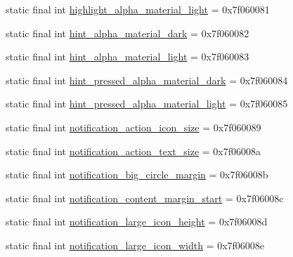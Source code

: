\begin{DoxyCompactItemize}
\item 
static final int \mbox{\hyperlink{classandroid_1_1support_1_1v7_1_1appcompat_1_1_r_1_1dimen_a86a754bbbd93cc196da3b0b984a92c32}{highlight\+\_\+alpha\+\_\+material\+\_\+light}} = 0x7f060081
\item 
static final int \mbox{\hyperlink{classandroid_1_1support_1_1v7_1_1appcompat_1_1_r_1_1dimen_a5efc01f623b7f9ebe49eb5d465af1fea}{hint\+\_\+alpha\+\_\+material\+\_\+dark}} = 0x7f060082
\item 
static final int \mbox{\hyperlink{classandroid_1_1support_1_1v7_1_1appcompat_1_1_r_1_1dimen_acb5326fcfa564801a635a71e58879dce}{hint\+\_\+alpha\+\_\+material\+\_\+light}} = 0x7f060083
\item 
static final int \mbox{\hyperlink{classandroid_1_1support_1_1v7_1_1appcompat_1_1_r_1_1dimen_aebb62a73f9575168ba99a010d1013dfb}{hint\+\_\+pressed\+\_\+alpha\+\_\+material\+\_\+dark}} = 0x7f060084
\item 
static final int \mbox{\hyperlink{classandroid_1_1support_1_1v7_1_1appcompat_1_1_r_1_1dimen_a9ff0848bc63374bd8e7268ceb5da26e8}{hint\+\_\+pressed\+\_\+alpha\+\_\+material\+\_\+light}} = 0x7f060085
\item 
static final int \mbox{\hyperlink{classandroid_1_1support_1_1v7_1_1appcompat_1_1_r_1_1dimen_ab3a1cc72fd13c55f21d979bab9e143ef}{notification\+\_\+action\+\_\+icon\+\_\+size}} = 0x7f060089
\item 
static final int \mbox{\hyperlink{classandroid_1_1support_1_1v7_1_1appcompat_1_1_r_1_1dimen_a1f92dd3602ccc49f68c057a19947c745}{notification\+\_\+action\+\_\+text\+\_\+size}} = 0x7f06008a
\item 
static final int \mbox{\hyperlink{classandroid_1_1support_1_1v7_1_1appcompat_1_1_r_1_1dimen_a0185f47f2f7ac8721ec928453dbdaeb6}{notification\+\_\+big\+\_\+circle\+\_\+margin}} = 0x7f06008b
\item 
static final int \mbox{\hyperlink{classandroid_1_1support_1_1v7_1_1appcompat_1_1_r_1_1dimen_abf52c017674e3f95367b18e5f4fbd361}{notification\+\_\+content\+\_\+margin\+\_\+start}} = 0x7f06008c
\item 
static final int \mbox{\hyperlink{classandroid_1_1support_1_1v7_1_1appcompat_1_1_r_1_1dimen_a2319b159ed59b8c5f1abd6eff006013a}{notification\+\_\+large\+\_\+icon\+\_\+height}} = 0x7f06008d
\item 
static final int \mbox{\hyperlink{classandroid_1_1support_1_1v7_1_1appcompat_1_1_r_1_1dimen_af2b2c0883067d2ce7b558856794f1d29}{notification\+\_\+large\+\_\+icon\+\_\+width}} = 0x7f06008e
\item 

\end{DoxyCompactItemize}
